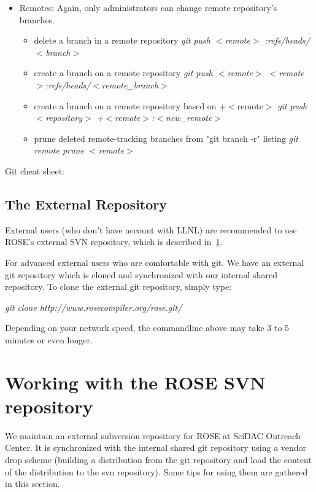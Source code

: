 \begin{itemize}
\item Remotes: Again, only administrators can change remote repository's branches.
   \begin{itemize}
       \item delete a branch in a remote repository \textit{git push $<$remote$>$ :refs/heads/$<$branch$>$}
       \item create a branch on a remote repository \textit{git push $<$remote$>$ $<$remote$>$:refs/heads/$<$remote\_branch$>$}
       \item create a branch on a remote repository based on +$<$remote$>$ \textit{git push $<$repository$>$ +$<$remote$>$:$<$new\_remote$>$}
       \item prune deleted remote-tracking branches from "git branch -r" listing \textit{ git remote prune $<$remote$>$ }
   \end{itemize}
\end{itemize}
Git cheat sheet: 

\subsection{The External Repository}

External users (who don't have account with LLNL) are recommended to use
ROSE's external SVN repository, which is described
in~\ref{gettingStarted::svn}.


For advanced external users who are comfortable with git. 
We have an external git repository which is cloned and synchronized with our internal shared repository. 
To clone the external git repository, simply type:

\textit{git clone http://www.rosecompiler.org/rose.git/}

\noindent Depending on your network speed, the commandline above may take 3 to 5
minutes or even longer.


 \section{Working with the ROSE SVN repository}%
\label{gettingStarted::svn}
We maintain an external subversion repository for ROSE at SciDAC Outreach
Center. It is synchronized with the internal shared git repository using a
vendor drop scheme (building a distribution from the git repository and
load the content of the distribution to the svn repository). 
Some tips for using them are gathered in this section. 


